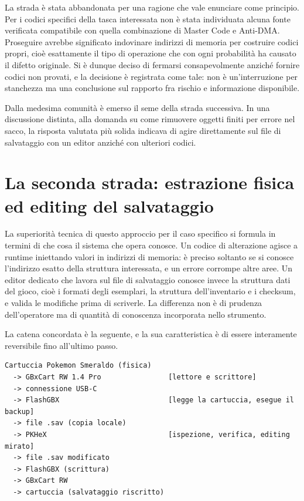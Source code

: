 La strada è stata abbandonata per una ragione che vale enunciare come principio. Per i codici specifici della tasca interessata non è stata individuata alcuna fonte verificata compatibile con quella combinazione di Master Code e Anti-DMA. Proseguire avrebbe significato indovinare indirizzi di memoria per costruire codici propri, cioè esattamente il tipo di operazione che con ogni probabilità ha causato il difetto originale. Si è dunque deciso di fermarsi consapevolmente anziché fornire codici non provati, e la decisione è registrata come tale: non è un'interruzione per stanchezza ma una conclusione sul rapporto fra rischio e informazione disponibile.

Dalla medesima comunità è emerso il seme della strada successiva. In una discussione distinta, alla domanda su come rimuovere oggetti finiti per errore nel sacco, la risposta valutata più solida indicava di agire direttamente sul file di salvataggio con un editor anziché con ulteriori codici.

\section{La seconda strada: estrazione fisica ed editing del salvataggio}

La superiorità tecnica di questo approccio per il caso specifico si formula in termini di che cosa il sistema che opera conosce. Un codice di alterazione agisce a runtime iniettando valori in indirizzi di memoria: è preciso soltanto se si conosce l'indirizzo esatto della struttura interessata, e un errore corrompe altre aree. Un editor dedicato che lavora sul file di salvataggio conosce invece la struttura dati del gioco, cioè i formati degli esemplari, la struttura dell'inventario e i checksum, e valida le modifiche prima di scriverle. La differenza non è di prudenza dell'operatore ma di quantità di conoscenza incorporata nello strumento.

La catena concordata è la seguente, e la sua caratteristica è di essere interamente reversibile fino all'ultimo passo.

\begin{verbatim}
Cartuccia Pokemon Smeraldo (fisica)
  -> GBxCart RW 1.4 Pro                [lettore e scrittore]
  -> connessione USB-C
  -> FlashGBX                          [legge la cartuccia, esegue il backup]
  -> file .sav (copia locale)
  -> PKHeX                             [ispezione, verifica, editing mirato]
  -> file .sav modificato
  -> FlashGBX (scrittura)
  -> GBxCart RW
  -> cartuccia (salvataggio riscritto)
\end{verbatim}

